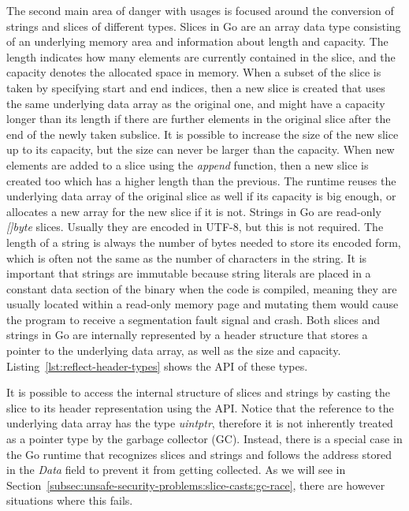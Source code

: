 The second main area of danger with \unsafe{} usages is focused around the conversion of strings and slices of different
types.
Slices in Go are an array data type consisting of an underlying memory area and information about length and capacity.
The length indicates how many elements are currently contained in the slice, and the capacity denotes the allocated
space in memory.
When a subset of the slice is taken by specifying start and end indices, then a new slice is created that uses the same
underlying data array as the original one, and might have a capacity longer than its length if there are further
elements in the original slice after the end of the newly taken subslice.
It is possible to increase the size of the new slice up to its capacity, but the size can never be larger than the
capacity.
When new elements are added to a slice using the \textit{append} function, then a new slice is created too which has a
higher length than the previous.
The runtime reuses the underlying data array of the original slice as well if its capacity is big enough, or allocates
a new array for the new slice if it is not.
Strings in Go are read-only \textit{[]byte} slices.
Usually they are encoded in UTF-8, but this is not required.
The length of a string is always the number of bytes needed to store its encoded form, which is often not the same as
the number of characters in the string.
It is important that strings are immutable because string literals are placed in a constant data section of the binary
when the code is compiled, meaning they are usually located within a read-only memory page and mutating them would cause
the program to receive a segmentation fault signal and crash.
Both slices and strings in Go are internally represented by a header structure that stores a pointer to the underlying
data array, as well as the size and capacity.
Listing~\ref{lst:reflect-header-types} shows the \acrshort{API} of these types.



It is possible to access the internal structure of slices and strings by casting the slice to its header representation
using the \unsafe{} API.
Notice that the reference to the underlying data array has the type \textit{uintptr}, therefore it is not inherently
treated as a pointer type by the garbage collector (\acrshort{GC}).
Instead, there is a special case in the Go runtime that recognizes slices and strings and follows the address stored in
the \textit{Data} field to prevent it from getting collected.
As we will see in Section~\ref{subsec:unsafe-security-problems:slice-casts:gc-race}, there are however situations where
this fails.


